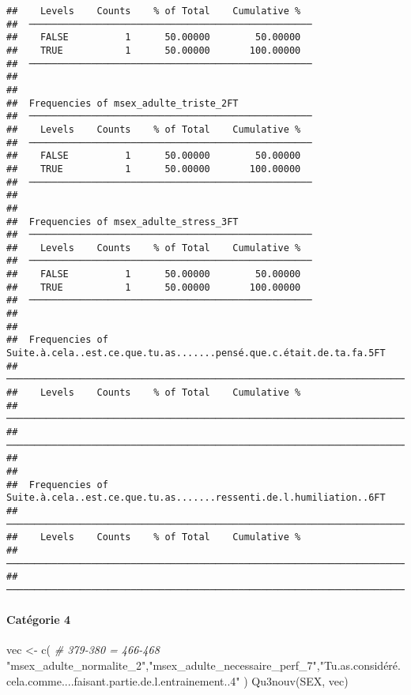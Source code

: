 \documentclass[
]{article}
\newenvironment{Shaded}{\begin{snugshade}}{\end{snugshade}}
\newcommand{\CommentTok}[1]{\textcolor[rgb]{0.56,0.35,0.01}{\textit{#1}}}
\newcommand{\FunctionTok}[1]{\textcolor[rgb]{0.00,0.00,0.00}{#1}}
\newcommand{\NormalTok}[1]{#1}
\newcommand{\OtherTok}[1]{\textcolor[rgb]{0.56,0.35,0.01}{#1}}
\newcommand{\StringTok}[1]{\textcolor[rgb]{0.31,0.60,0.02}{#1}}
\begin{document}
\begin{verbatim}
##    Levels    Counts    % of Total    Cumulative %   
##  ────────────────────────────────────────────────── 
##    FALSE          1      50.00000        50.00000   
##    TRUE           1      50.00000       100.00000   
##  ────────────────────────────────────────────────── 
## 
## 
##  Frequencies of msex_adulte_triste_2FT              
##  ────────────────────────────────────────────────── 
##    Levels    Counts    % of Total    Cumulative %   
##  ────────────────────────────────────────────────── 
##    FALSE          1      50.00000        50.00000   
##    TRUE           1      50.00000       100.00000   
##  ────────────────────────────────────────────────── 
## 
## 
##  Frequencies of msex_adulte_stress_3FT              
##  ────────────────────────────────────────────────── 
##    Levels    Counts    % of Total    Cumulative %   
##  ────────────────────────────────────────────────── 
##    FALSE          1      50.00000        50.00000   
##    TRUE           1      50.00000       100.00000   
##  ────────────────────────────────────────────────── 
## 
## 
##  Frequencies of Suite.à.cela..est.ce.que.tu.as.......pensé.que.c.était.de.ta.fa.5FT 
##  ────────────────────────────────────────────────────────────────────────────────── 
##    Levels    Counts    % of Total    Cumulative %   
##  ────────────────────────────────────────────────────────────────────────────────── 
##  ────────────────────────────────────────────────────────────────────────────────── 
## 
## 
##  Frequencies of Suite.à.cela..est.ce.que.tu.as.......ressenti.de.l.humiliation..6FT 
##  ────────────────────────────────────────────────────────────────────────────────── 
##    Levels    Counts    % of Total    Cumulative %   
##  ────────────────────────────────────────────────────────────────────────────────── 
##  ──────────────────────────────────────────────────────────────────────────────────
\end{verbatim}

\hypertarget{catuxe9gorie-4-4}{%
\paragraph{Catégorie 4}\label{catuxe9gorie-4-4}}

\begin{Shaded}
\begin{Highlighting}[]
\NormalTok{vec }\OtherTok{\textless{}{-}} \FunctionTok{c}\NormalTok{(  }\CommentTok{\# 379{-}380 = 466{-}468}
  \StringTok{"msex\_adulte\_normalite\_2"}\NormalTok{,}\StringTok{"msex\_adulte\_necessaire\_perf\_7"}\NormalTok{,}\StringTok{"Tu.as.considéré.cela.comme....faisant.partie.de.l.entrainement..4"}
\NormalTok{)}
\FunctionTok{Qu3nouv}\NormalTok{(SEX, vec)}
\end{Highlighting}
\end{Shaded}
\end{document}
